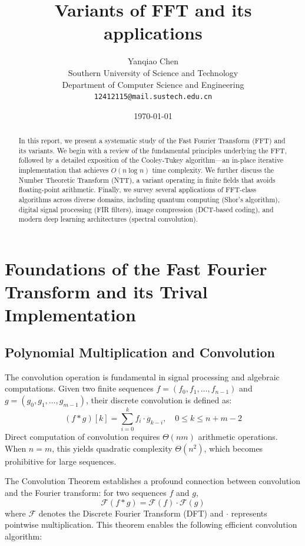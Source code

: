 \documentclass[a4paper]{article}
\title{\bf{Variants of FFT and its applications}}
\author{Yanqiao Chen\\
        Southern University of Science and Technology\\
        Department of Computer Science and Engineering\\
        \texttt{12412115@mail.sustech.edu.cn}}
\date{\today}
\theoremstyle{definition}
\begin{document}
\maketitle

\begin{abstract}
In this report, we present a systematic study of the Fast Fourier Transform (FFT) and its variants. We begin with a review of the fundamental principles underlying the FFT, followed by a detailed exposition of the Cooley-Tukey algorithm---an in-place iterative implementation that achieves $O(n \log n)$ time complexity. We further discuss the Number Theoretic Transform (NTT), a variant operating in finite fields that avoids floating-point arithmetic. Finally, we survey several applications of FFT-class algorithms across diverse domains, including quantum computing (Shor's algorithm), digital signal processing (FIR filters), image compression (DCT-based coding), and modern deep learning architectures (spectral convolution).
\end{abstract}

\tableofcontents

\newpage

\section{Foundations of the Fast Fourier Transform and its Trival Implementation} 

\subsection{Polynomial Multiplication and Convolution}

The convolution operation is fundamental in signal processing and algebraic computations. Given two finite sequences \( f = (f_0, f_1, \ldots, f_{n-1}) \) and \( g = (g_0, g_1, \ldots, g_{m-1}) \), their discrete convolution is defined as:
\[
(f * g)[k] = \sum_{i=0}^{k} f_i \cdot g_{k-i}, \quad 0 \leq k \leq n+m-2
\]
Direct computation of convolution requires \( \Theta(nm) \) arithmetic operations. When \( n = m \), this yields quadratic complexity \( \Theta(n^2) \), which becomes prohibitive for large sequences.

The Convolution Theorem establishes a profound connection between convolution and the Fourier transform: for two sequences \( f \) and \( g \),
\[
\mathcal{F}(f * g) = \mathcal{F}(f) \cdot \mathcal{F}(g)
\]
where \( \mathcal{F} \) denotes the Discrete Fourier Transform (DFT) and \( \cdot \) represents pointwise multiplication. This theorem enables the following efficient convolution algorithm:
\end{document}
